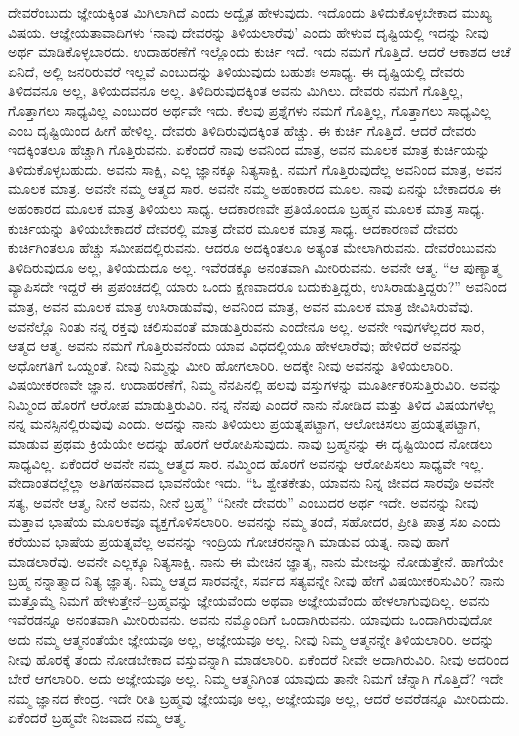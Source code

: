 ದೇವರೆಂಬುದು ಜ್ಞೇಯಕ್ಕಿಂತ ಮಿಗಿಲಾಗಿದೆ ಎಂದು ಅದ್ವೈತ ಹೇಳುವುದು. ಇದೊಂದು ತಿಳಿದುಕೊಳ್ಳಬೇಕಾದ ಮುಖ್ಯ ವಿಷಯ. ಆಜ್ಞೇಯತಾವಾದಿಗಳು ‘ನಾವು ದೇವರನ್ನು ತಿಳಿಯಲಾರೆವು’ ಎಂದು ಹೇಳುವ ದೃಷ್ಟಿಯಲ್ಲಿ ಇದನ್ನು ನೀವು ಅರ್ಥ ಮಾಡಿಕೊಳ್ಳಬಾರದು. ಉದಾಹರಣೆಗೆ ಇಲ್ಲೊಂದು ಕುರ್ಚಿ ಇದೆ. ಇದು ನಮಗೆ ಗೊತ್ತಿದೆ. ಆದರೆ ಆಕಾಶದ ಆಚೆ ಏನಿದೆ, ಅಲ್ಲಿ ಜನರಿರುವರೆ ಇಲ್ಲವೆ ಎಂಬುದನ್ನು ತಿಳಿಯುವುದು ಬಹುಶಃ ಅಸಾಧ್ಯ. ಈ ದೃಷ್ಟಿಯಲ್ಲಿ ದೇವರು ತಿಳಿದವನೂ ಅಲ್ಲ, ತಿಳಿಯದವನೂ ಅಲ್ಲ. ತಿಳಿದಿರುವುದಕ್ಕಿಂತ ಅವನು ಮಿಗಿಲು. ದೇವರು ನಮಗೆ ಗೊತ್ತಿಲ್ಲ, ಗೊತ್ತಾಗಲು ಸಾಧ್ಯವಿಲ್ಲ ಎಂಬುದರ ಅರ್ಥವೇ ಇದು. ಕೆಲವು ಪ್ರಶ್ನೆಗಳು ನಮಗೆ ಗೊತ್ತಿಲ್ಲ, ಗೊತ್ತಾಗಲು ಸಾಧ್ಯವಿಲ್ಲ ಎಂಬ ದೃಷ್ಟಿಯಿಂದ ಹೀಗೆ ಹೇಳಿಲ್ಲ. ದೇವರು ತಿಳಿದಿರುವುದಕ್ಕಿಂತ ಹೆಚ್ಚು. ಈ ಕುರ್ಚಿ ಗೊತ್ತಿದೆ. ಆದರೆ ದೇವರು ಇದಕ್ಕಿಂತಲೂ ಹೆಚ್ಚಾಗಿ ಗೊತ್ತಿರುವನು. ಏಕೆಂದರೆ ನಾವು ಅವನಿಂದ ಮಾತ್ರ, ಅವನ ಮೂಲಕ ಮಾತ್ರ ಕುರ್ಚಿಯನ್ನು ತಿಳಿದುಕೊಳ್ಳಬಹುದು. ಅವನು ಸಾಕ್ಷಿ, ಎಲ್ಲ ಜ್ಞಾನಕ್ಕೂ ನಿತ್ಯಸಾಕ್ಷಿ. ನಮಗೆ ಗೊತ್ತಿರುವುದೆಲ್ಲ ಅವನಿಂದ ಮಾತ್ರ, ಅವನ ಮೂಲಕ ಮಾತ್ರ. ಅವನೇ ನಮ್ಮ ಆತ್ಮದ ಸಾರ. ಅವನೇ ನಮ್ಮ ಅಹಂಕಾರದ ಮೂಲ. ನಾವು ಏನನ್ನು ಬೇಕಾದರೂ ಈ ಅಹಂಕಾರದ ಮೂಲಕ ಮಾತ್ರ ತಿಳಿಯಲು ಸಾಧ್ಯ. ಆದಕಾರಣವೇ ಪ್ರತಿಯೊಂದೂ ಬ್ರಹ್ಮನ ಮೂಲಕ ಮಾತ್ರ ಸಾಧ್ಯ. ಕುರ್ಚಿಯನ್ನು ತಿಳಿಯಬೇಕಾದರೆ ದೇವರಲ್ಲಿ ಮಾತ್ರ ದೇವರ ಮೂಲಕ ಮಾತ್ರ ಸಾಧ್ಯ. ಆದಕಾರಣವೆ ದೇವರು ಕುರ್ಚಿಗಿಂತಲೂ ಹೆಚ್ಚು ಸಮೀಪದಲ್ಲಿರುವನು. ಆದರೂ ಅದಕ್ಕಿಂತಲೂ ಅತ್ಯಂತ ಮೇಲಾಗಿರುವನು. ದೇವರೆಂಬುವನು ತಿಳಿದಿರುವುದೂ ಅಲ್ಲ, ತಿಳಿಯದುದೂ ಅಲ್ಲ. ಇವೆರಡಕ್ಕೂ ಅನಂತವಾಗಿ ಮೀರಿರುವನು. ಅವನೇ ಆತ್ಮ. “ಆ ಪುಣ್ಯಾತ್ಮ ವ್ಯಾಪಿಸದೇ ಇದ್ದರೆ ಈ ಪ್ರಪಂಚದಲ್ಲಿ ಯಾರು ಒಂದು ಕ್ಷಣವಾದರೂ ಬದುಕುತ್ತಿದ್ದರು, ಉಸಿರಾಡುತ್ತಿದ್ದರು?” ಅವನಿಂದ ಮಾತ್ರ, ಅವನ ಮೂಲಕ ಮಾತ್ರ ಉಸಿರಾಡುವೆವು, ಅವನಿಂದ ಮಾತ್ರ, ಅವನ ಮೂಲಕ ಮಾತ್ರ ಜೀವಿಸಿರುವೆವು. ಅವನೆಲ್ಲೊ ನಿಂತು ನನ್ನ ರಕ್ತವು ಚಲಿಸುವಂತೆ ಮಾಡುತ್ತಿರುವನು ಎಂದೇನೂ ಅಲ್ಲ. ಅವನೇ ಇವುಗಳೆಲ್ಲದರ ಸಾರ, ಆತ್ಮದ ಆತ್ಮ. ಅವನು ನಮಗೆ ಗೊತ್ತಿರುವನೆಂದು ಯಾವ ವಿಧದಲ್ಲಿಯೂ ಹೇಳಲಾರೆವು; ಹೇಳಿದರೆ ಅವನನ್ನು ಅಧೋಗತಿಗೆ ಒಯ್ದಂತೆ. ನೀವು ನಿಮ್ಮನ್ನು ಮೀರಿ ಹೋಗಲಾರಿರಿ. ಅದಕ್ಕೇ ನೀವು ಅವನನ್ನು ತಿಳಿಯಲಾರಿರಿ. ವಿಷಯೀಕರಣವೇ ಜ್ಞಾನ. ಉದಾಹರಣೆಗೆ, ನಿಮ್ಮ ನೆನಪಿನಲ್ಲಿ ಹಲವು ವಸ್ತುಗಳನ್ನು ಮೂರ್ತೀಕರಿಸುತ್ತಿರುವಿರಿ. ಅವನ್ನು ನಿಮ್ಮಿಂದ ಹೊರಗೆ ಆರೋಪ ಮಾಡುತ್ತಿರುವಿರಿ. ನನ್ನ ನೆನಪು ಎಂದರೆ ನಾನು ನೋಡಿದ ಮತ್ತು ತಿಳಿದ ವಿಷಯಗಳೆಲ್ಲ ನನ್ನ ಮನಸ್ಸಿನಲ್ಲಿರುವುವು ಎಂದು. ಅದನ್ನು ನಾನು ತಿಳಿಯಲು ಪ್ರಯತ್ನಪಟ್ಟಾಗ, ಆಲೋಚಿಸಲು ಪ್ರಯತ್ನಪಟ್ಟಾಗ, ಮಾಡುವ ಪ್ರಥಮ ಕ್ರಿಯೆಯೇ ಅದನ್ನು ಹೊರಗೆ ಆರೋಪಿಸುವುದು. ನಾವು ಬ್ರಹ್ಮನನ್ನು ಈ ದೃಷ್ಟಿಯಿಂದ ನೋಡಲು ಸಾಧ್ಯವಿಲ್ಲ. ಏಕೆಂದರೆ ಅವನೇ ನಮ್ಮ ಆತ್ಮದ ಸಾರ. ನಮ್ಮಿಂದ ಹೊರಗೆ ಅವನನ್ನು ಆರೋಪಿಸಲು ಸಾಧ್ಯವೇ ಇಲ್ಲ. ವೇದಾಂತದಲ್ಲೆಲ್ಲಾ ಅತಿಗಹನವಾದ ಭಾವನೆಯೇ ಇದು. “ಓ ಶ್ವೇತಕೇತು, ಯಾವನು ನಿನ್ನ ಜೀವದ ಸಾರವೊ ಅವನೇ ಸತ್ಯ, ಅವನೇ ಆತ್ಮ, ನೀನೆ ಅವನು, ನೀನೆ ಬ್ರಹ್ಮ” “ನೀನೇ ದೇವರು” ಎಂಬುದರ ಅರ್ಥ ಇದೇ. ಅವನನ್ನು ನೀವು ಮತ್ತಾವ ಭಾಷೆಯ ಮೂಲಕವೂ ವ್ಯಕ್ತಗೊಳಿಸಲಾರಿರಿ. ಅವನನ್ನು ನಮ್ಮ ತಂದೆ, ಸಹೋದರ, ಪ್ರೀತಿ ಪಾತ್ರ ಸಖ ಎಂದು ಕರೆಯುವ ಭಾಷೆಯ ಪ್ರಯತ್ನವೆಲ್ಲ ಅವನನ್ನು ಇಂದ್ರಿಯ ಗೋಚರನನ್ನಾಗಿ ಮಾಡುವ ಯತ್ನ. ನಾವು ಹಾಗೆ ಮಾಡಲಾರೆವು. ಅವನೇ ಎಲ್ಲಕ್ಕೂ ನಿತ್ಯಸಾಕ್ಷಿ. ನಾನು ಈ ಮೇಚಿನ ಜ್ಞಾತೃ, ನಾನು ಮೇಜನ್ನು ನೋಡುತ್ತೇನೆ. ಹಾಗೆಯೇ ಬ್ರಹ್ಮ ನನ್ನಾತ್ಮಾದ ನಿತ್ಯ ಜ್ಞಾತೃ. ನಿಮ್ಮ ಆತ್ಮದ ಸಾರವನ್ನೇ, ಸರ್ವದ ಸತ್ಯವನ್ನೇ ನೀವು ಹೇಗೆ ವಿಷಯೀಕರಿಸುವಿರಿ? ನಾನು ಮತ್ತೊಮ್ಮೆ ನಿಮಗೆ ಹೇಳುತ್ತೇನೆ–\break ಬ್ರಹ್ಮವನ್ನು ಜ್ಞೇಯವೆಂದು ಅಥವಾ ಅಜ್ಞೇಯವೆಂದು ಹೇಳಲಾಗುವುದಿಲ್ಲ. ಅವನು ಇವೆರಡನ್ನೂ ಅನಂತವಾಗಿ ಮೀರಿರುವನು. ಅವನು ನಮ್ಮೊಂದಿಗೆ ಒಂದಾಗಿರುವನು. ಯಾವುದು ಒಂದಾಗಿರುವುದೋ ಅದು ನಮ್ಮ ಆತ್ಮನಂತೆಯೇ ಜ್ಞೇಯವೂ ಅಲ್ಲ, ಅಜ್ಞೇಯವೂ ಅಲ್ಲ. ನೀವು ನಿಮ್ಮ ಆತ್ಮನನ್ನೇ ತಿಳಿಯಲಾರಿರಿ. ಅದನ್ನು ನೀವು ಹೊರಕ್ಕೆ ತಂದು ನೋಡಬೇಕಾದ ವಸ್ತುವನ್ನಾಗಿ ಮಾಡಲಾರಿರಿ. ಏಕೆಂದರೆ ನೀವೇ ಅದಾಗಿರುವಿರಿ. ನೀವು ಅದರಿಂದ ಬೇರೆ ಆಗಲಾರಿರಿ. ಅದು ಅಜ್ಞೇಯವೂ ಅಲ್ಲ. ನಿಮ್ಮ ಆತ್ಮನಿಗಿಂತ ಯಾವುದು ತಾನೇ ನಿಮಗೆ ಚೆನ್ನಾಗಿ ಗೊತ್ತಿದೆ? ಇದೇ ನಮ್ಮ ಜ್ಞಾನದ ಕೇಂದ್ರ. ಇದೇ ರೀತಿ ಬ್ರಹ್ಮವು ಜ್ಞೇಯವೂ ಅಲ್ಲ, ಅಜ್ಞೇಯವೂ ಅಲ್ಲ, ಆದರೆ ಅವರೆಡನ್ನೂ ಮೀರಿದುದು. ಏಕೆಂದರೆ ಬ್ರಹ್ಮವೇ ನಿಜವಾದ ನಮ್ಮ ಆತ್ಮ.

